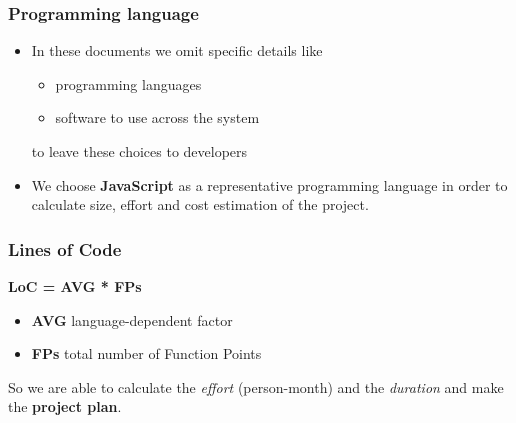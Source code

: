 
\begin{frame}
	\frametitle{Programming language}
	\begin{itemize}	
		\item In these documents we omit specific details like
			\begin{itemize}
				\item programming languages
				\item software to use across the system
			\end{itemize}
			to leave these choices to developers
		\pause
		\item We choose \textbf{JavaScript} as a representative programming language in order to calculate size, effort and cost estimation of the project. 
	\end{itemize}
\end{frame}

\begin{frame}
	\frametitle{Lines of Code}
	\begin{center}
		\textbf{LoC = AVG * FPs}
	\end{center}
	\pause
	\begin{itemize}
		\item \textbf{AVG} language-dependent factor
		\item \textbf{FPs} total number of Function Points
	\end{itemize}

	So we are able to calculate the \textit{effort} (person-month) and the \textit{duration} and make the \textbf{project plan}.
\end{frame}

